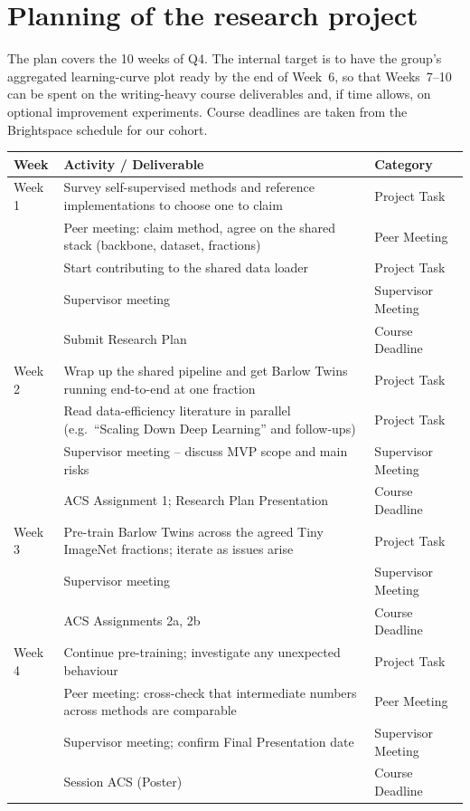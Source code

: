 \documentclass[english, a4paper]{article}
\begin{document}
\section*{Planning of the research project}
The plan covers the 10 weeks of Q4. The internal target is to have the group's aggregated learning-curve plot ready by the end of Week~6, so that Weeks~7--10 can be spent on the writing-heavy course deliverables and, if time allows, on optional improvement experiments. Course deadlines are taken from the Brightspace schedule for our cohort.

{\small
\begin{longtable}{p{1.2cm} p{9.5cm} p{3.5cm}}
\toprule
\textbf{Week} & \textbf{Activity / Deliverable} & \textbf{Category} \\
\midrule
\endhead

Week 1 & Survey self-supervised methods and reference implementations to choose one to claim & Project Task \\
       & Peer meeting: claim method, agree on the shared stack (backbone, dataset, fractions) & Peer Meeting \\
       & Start contributing to the shared data loader & Project Task \\
       & Supervisor meeting & Supervisor Meeting \\
       & Submit Research Plan & Course Deadline \\
\midrule

Week 2 & Wrap up the shared pipeline and get Barlow Twins running end-to-end at one fraction & Project Task \\
       & Read data-efficiency literature in parallel (e.g.\ ``Scaling Down Deep Learning'' and follow-ups) & Project Task \\
       & Supervisor meeting -- discuss MVP scope and main risks & Supervisor Meeting \\
       & ACS Assignment 1; Research Plan Presentation & Course Deadline \\
\midrule

Week 3 & Pre-train Barlow Twins across the agreed Tiny ImageNet fractions; iterate as issues arise & Project Task \\
       & Supervisor meeting & Supervisor Meeting \\
       & ACS Assignments 2a, 2b & Course Deadline \\
\midrule

Week 4 & Continue pre-training; investigate any unexpected behaviour & Project Task \\
       & Peer meeting: cross-check that intermediate numbers across methods are comparable & Peer Meeting \\
       & Supervisor meeting; confirm Final Presentation date & Supervisor Meeting \\
       & Session ACS (Poster) & Course Deadline \\
\midrule


\end{longtable}}
\end{document}
